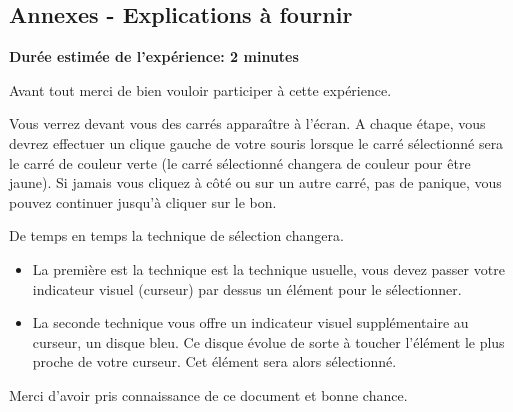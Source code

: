 \subsection*{Annexes - Explications à fournir} \label{explanation}

\hspace{1em}

\textbf{Durée estimée de l'expérience: 2 minutes}

Avant tout merci de bien vouloir participer à cette expérience.

\hspace{1em}

Vous verrez devant vous des carrés apparaître à l'écran. A chaque étape, vous devrez effectuer un clique gauche de votre souris lorsque le carré sélectionné sera le carré de couleur verte (le carré sélectionné changera de couleur pour être jaune). Si jamais vous cliquez à côté ou sur un autre carré, pas de panique, vous pouvez continuer jusqu'à cliquer sur le bon.

De temps en temps la technique de sélection changera.
\begin{itemize}
    \item La première est la technique est la technique usuelle, vous devez passer votre indicateur visuel (curseur) par dessus un élément pour le sélectionner.
    \item La seconde technique vous offre un indicateur visuel supplémentaire au curseur, un disque bleu. Ce disque évolue de sorte à toucher l'élément le plus proche de votre curseur. Cet élément sera alors sélectionné.
\end{itemize}

\hspace{1em}

Merci d'avoir pris connaissance de ce document et bonne chance.

